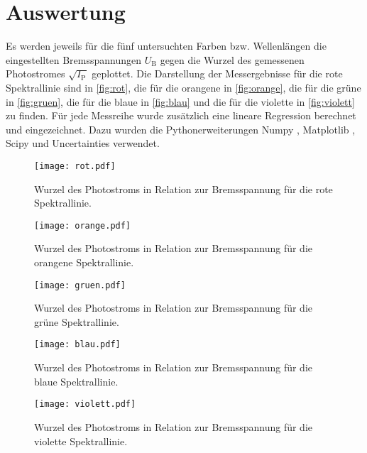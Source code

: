 \section{Auswertung}
\label{sec:Auswertung}

Es werden jeweils für die fünf untersuchten Farben bzw. Wellenlängen die eingestellten Bremsspannungen $U_\text{B}$ gegen die Wurzel des gemessenen Photostromes $\sqrt{I_\text{P}}$
geplottet. Die Darstellung der Messergebnisse für die rote Spektrallinie sind in \autoref{fig:rot}, die für die orangene in \autoref{fig:orange},
die für die grüne in \autoref{fig:gruen}, die für die blaue in \autoref{fig:blau} und die für die violette in \autoref{fig:violett} zu finden.
Für jede Messreihe wurde zusätzlich eine lineare Regression berechnet und eingezeichnet. Dazu wurden die Pythonerweiterungen Numpy \cite{numpy}, Matplotlib \cite{matplotlib}, Scipy \cite{scipy} und Uncertainties \cite{uncertainties} verwendet.

\begin{figure}[H]
  \centering
  \texttt{[image: rot.pdf]}
  \caption{Wurzel des Photostroms in Relation zur Bremsspannung für die rote Spektrallinie.}
  \label{fig:rot}
\end{figure}

\begin{figure}[H]
  \centering
  \texttt{[image: orange.pdf]}
  \caption{Wurzel des Photostroms in Relation zur Bremsspannung für die orangene Spektrallinie.}
  \label{fig:orange}
\end{figure}

\begin{figure}[H]
  \centering
  \texttt{[image: gruen.pdf]}
  \caption{Wurzel des Photostroms in Relation zur Bremsspannung für die grüne Spektrallinie.}
  \label{fig:gruen}
\end{figure}

\begin{figure}[H]
  \centering
  \texttt{[image: blau.pdf]}
  \caption{Wurzel des Photostroms in Relation zur Bremsspannung für die blaue Spektrallinie.}
  \label{fig:blau}
\end{figure}

\begin{figure}[H]
  \centering
  \texttt{[image: violett.pdf]}
  \caption{Wurzel des Photostroms in Relation zur Bremsspannung für die violette Spektrallinie.}
  \label{fig:violett}
\end{figure}

